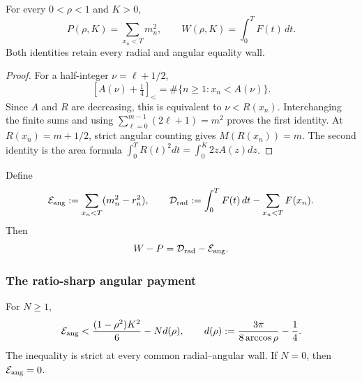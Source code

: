 \begin{lemma}
\label{rs:lem:layer-cake}
For every $0<\rho<1$ and $K>0$,
\begin{equation}
 P(\rho,K)=\sum_{x_n<T}m_n^2,
 \qquad
 W(\rho,K)=\int_0^T F(t)\,dt.
 \label{rs:eq:layer-cake}
\end{equation}
Both identities retain every radial and angular equality wall.
\end{lemma}

\begin{proof}
For a half-integer $\nu=\ell+1/2$,
\[
 [A(\nu)+\tfrac14]_<
 =\#\{n\geq1:x_n<A(\nu)\}.
\]
Since $A$ and $R$ are decreasing, this is equivalent to
$\nu<R(x_n)$.  Interchanging the finite sums and using
$\sum_{\ell=0}^{m-1}(2\ell+1)=m^2$ proves the first identity.  At
$R(x_n)=m+1/2$, strict angular counting gives $M(R(x_n))=m$.
The second identity is the area formula
$\int_0^TR(t)^2dt=\int_0^K2zA(z)dz$.
\end{proof}

Define
\begin{equation}
 \mathcal E_{\rm ang}:=\sum_{x_n<T}(m_n^2-r_n^2),
 \qquad
 \mathcal D_{\rm rad}:=\int_0^TF(t)\,dt-\sum_{x_n<T}F(x_n).
 \label{rs:eq:defects}
\end{equation}
Then
\begin{equation}
 W-P=\mathcal D_{\rm rad}-\mathcal E_{\rm ang}.
 \label{rs:eq:master-defect}
\end{equation}

\subsubsection*{The ratio-sharp angular payment}

\begin{proposition}
\label{rs:prop:angular}
For $N\geq1$,
\begin{equation}
 \mathcal E_{\rm ang}
 <\frac{(1-\rho^2)K^2}{6}-N d(\rho),
 \qquad
 d(\rho):=\frac{3\pi}{8\arccos\rho}-\frac14.
 \label{rs:eq:angular-sharp}
\end{equation}
The inequality is strict at every common radial--angular wall.  If $N=0$,
then $\mathcal E_{\rm ang}=0$.
\end{proposition}

